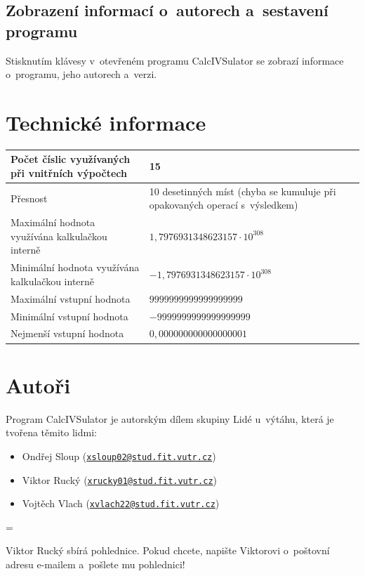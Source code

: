 \documentclass[a5paper,8pt,twoside]{extarticle}
\newcommand*{\appname}{CalcIVSulator}
\newcommand{\email}[1]{\texttt{\href{mailto:#1}{#1}}}
\newenvironment{infoBox}
  {\par\begin{mdframed}[linewidth=1pt,linecolor=black]%
    \begin{list}{}{\leftmargin=1cm
                   \labelwidth=\leftmargin}\item[\Large\lefthand]}
  {\end{list}\end{mdframed}\par}
\begin{document}
    \subsection{Zobrazení informací o~autorech a~sestavení programu}
    Stisknutím klávesy  v~otevřeném programu \appname{} se zobrazí informace o~programu, jeho autorech a~verzi.

    \section{Technické informace}

    \begin{table}[h]
    \begin{tabularx}{\textwidth}{|X|X|}
    \hline
    Počet číslic využívaných při vnitřních výpočtech & 15 \\ \hline
    Přesnost & 10 desetinných míst (chyba se kumuluje při opakovaných operací s~výsledkem) \\ \hline
    Maximální hodnota využívána kalkulačkou interně& $1,7976931348623157 \cdot 10^{308}$ \\ \hline
    Minimální hodnota využívána kalkulačkou interně & $-1,7976931348623157 \cdot 10^{308}$ \\ \hline
    Maximální vstupní hodnota& $9999999999999999999$ \\ \hline
    Minimální vstupní hodnota& $-9999999999999999999$ \\ \hline
    Nejmenší vstupní hodnota& $0,000000000000000001$ \\ \hline
    \end{tabularx}
    \end{table}

    \section{Autoři}

    Program \appname{} je autorským dílem skupiny Lidé u~výtáhu, která je tvořena těmito lidmi:

    \begin{itemize}
        \item Ondřej Sloup (\email{xsloup02@stud.fit.vutr.cz})
        \item Viktor Rucký (\email{xrucky01@stud.fit.vutr.cz})
        \item Vojtěch Vlach (\email{xvlach22@stud.fit.vutr.cz})
    \end{itemize}

    \begin{infoBox}
        Viktor Rucký sbírá pohlednice. Pokud chcete, napište Viktorovi o~poštovní adresu e-mailem a~pošlete mu pohlednici!
    \end{infoBox}
\end{document}
